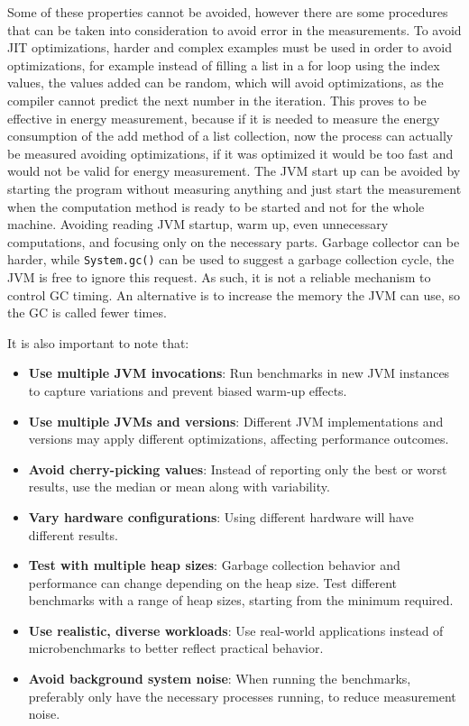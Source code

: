 Some of these properties cannot be avoided, however there are some procedures that can be taken into consideration to avoid error in the measurements.
To avoid JIT optimizations, harder and complex examples must be used in order to avoid optimizations, for example instead of filling a list in a for loop using the index values, the values added can be random, which will avoid optimizations, as the compiler cannot predict the next number in the iteration. This proves to be effective in energy measurement, because if it is needed to measure the energy consumption of the add method of a list collection, now the process can actually be measured avoiding optimizations, if it was optimized it would be too fast and would not be valid for energy measurement.
The JVM start up can be avoided by starting the program without measuring anything and just start the measurement when the computation method is ready to be started and not for the whole machine. Avoiding reading JVM startup, warm up, even unnecessary computations, and focusing only on the necessary parts.
Garbage collector can be harder, while \texttt{System.gc()} can be used to suggest a garbage collection cycle, the JVM is free to ignore this request. As such, it is not a reliable mechanism to control GC timing. An alternative is to increase the memory the JVM can use, so the GC is called fewer times. 


It is also important to note that:


\begin{itemize}
    \item \textbf{Use multiple JVM invocations}: Run benchmarks in new JVM instances to capture variations and prevent biased warm-up effects.
    
    \item \textbf{Use multiple JVMs and versions}: Different JVM implementations and versions may apply different optimizations, affecting performance outcomes.
    
    \item \textbf{Avoid cherry-picking values}:  Instead of reporting only the best or worst results, use the median or mean along with variability.
    
    \item \textbf{Vary hardware configurations}: Using different hardware will have different results.
    
    \item \textbf{Test with multiple heap sizes}: Garbage collection behavior and performance can change depending on the heap size. Test different benchmarks with a range of heap sizes, starting from the minimum required.
    
    \item \textbf{Use realistic, diverse workloads}: Use real-world applications instead of microbenchmarks to better reflect practical behavior.
    
    \item \textbf{Avoid background system noise}: When running the benchmarks, preferably only have the necessary processes running, to reduce measurement noise.
\end{itemize}

